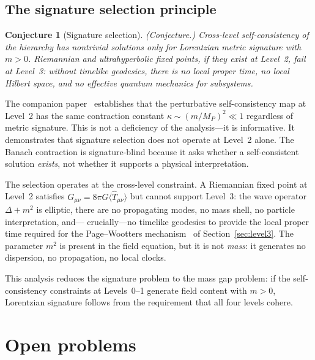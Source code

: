 \documentclass[12pt,a4paper]{article}
\newtheorem{conjecture}{Conjecture}
\theoremstyle{definition}
\theoremstyle{remark}
\begin{document}
\subsection{The signature selection principle}

\begin{conjecture}[Signature selection]
\emph{(Conjecture.)}
\label{conj:signature}
Cross-level self-consistency of the hierarchy has nontrivial solutions only for
Lorentzian metric signature with $m > 0$. Riemannian and ultrahyperbolic
fixed points, if they exist at Level~2, fail at Level~3: without timelike
geodesics, there is no local proper time, no local Hilbert space, and no
effective quantum mechanics for subsystems.
\end{conjecture}

The companion paper~\cite{fixed_point} establishes that the perturbative
self-consistency map at Level~2 has the same contraction constant
$\kappa \sim (m/M_P)^2 \ll 1$ regardless of metric signature. This is not a
deficiency of the analysis---it is informative. It demonstrates that signature
selection does not operate at Level~2 alone. The Banach contraction is
signature-blind because it asks whether a self-consistent solution
\emph{exists}, not whether it supports a physical interpretation.

The selection operates at the cross-level constraint. A Riemannian fixed point
at Level~2 satisfies $G_{\mu\nu} = 8\pi G\langle\hat{T}_{\mu\nu}\rangle$ but
cannot support Level~3: the wave operator $\Delta + m^2$ is elliptic, there
are no propagating modes, no mass shell, no particle interpretation, and---
crucially---no timelike geodesics to provide the local proper time required for
the Page--Wootters mechanism~\cite{page_wootters} of Section~\ref{sec:level3}.
The parameter $m^2$ is present in the field equation, but it is not
\emph{mass}: it generates no dispersion, no propagation, no local clocks.

This analysis reduces the signature problem to the mass gap problem: if the
self-consistency constraints at Levels~0--1 generate field content with $m > 0$,
Lorentzian signature follows from the requirement that all four levels cohere.

\section{Open problems}
\label{sec:open}
\end{document}
